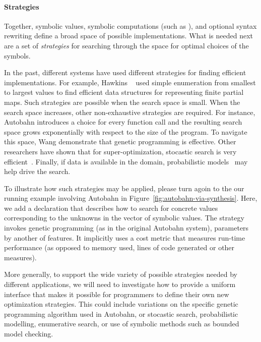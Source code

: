 \paragraph*{Strategies}
Together, symbolic values, symbolic computations (such as ),
and optional syntax rewriting define a broad space of possible
implementations.  What is needed next are a set of \emph{strategies}
for searching through the space for optimal choices of the symbols.

In the past, different systems have used different strategies for finding
efficient implementations.  For example, Hawkins \etal~\cite{data-rep-synth} used
simple enumeration from smallest to largest values to find efficient
data structures for representing finite partial maps.  Such strategies are
possible when the search space is small.  When the search space increases,
other non-exhaustive strategies are required.  For instance, Autobahn 
introduces a choice for every function call and the resulting search
space grows exponentially with respect to the size of the program.  To
navigate this space, Wang \etal demonstrate that genetic programming is effective.
Other researchers have shown that for super-optimization, stocastic search is very
efficient~\cite{stochastic-superopt}.  Finally, if data is available in the domain, probabilistic
models~\cite{probabilistic} may help drive the search.

To illustrate how such strategies may be applied, please turn agoin to
the our running example \rasp involving Autobahn in
Figure~\ref{fig:autobahn-via-synthesis}.  Here, we add a declaration
that describes how to search for concrete values corresponding to the
unknowns in the  vector of symbolic values.  The strategy
invokes genetic programming (as in the original Autobahn system),
parameters by another of features.  It implicitly uses a
cost metric that measures run-time performance (as opposed to memory used,
lines of code generated or other measures).

More generally, to support the wide variety of possible strategies
needed by different applications, we will need to investigate how to
provide a uniform interface that makes it possible for programmers to
define their own new optimization strategies.  This could include
variations on the specific genetic programming algorithm used in
Autobahn, or stocastic search, probabilistic modelling, enumerative
search, or use of symbolic methods such as bounded model checking.

